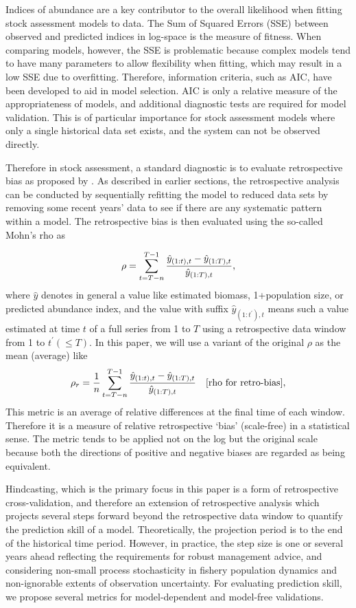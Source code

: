 
Indices of abundance are a key contributor to the overall likelihood when fitting stock assessment models to data. The Sum of Squared Errors (SSE) between observed and predicted indices in log-space is the measure of fitness. When comparing models, however, the SSE is problematic because complex models tend to have many parameters to allow flexibility when fitting, which may result in a low SSE due to overfitting. Therefore, information criteria, such as AIC, have been developed to aid in model selection. AIC is only a relative measure of the appropriateness of models, and additional diagnostic tests are required for model validation. This is of particular importance for stock assessment models where only a single historical data set exists, and the system can not be observed directly.

Therefore in stock assessment, a standard diagnostic is to evaluate retrospective bias as proposed by \cite{mohn1999retrospectyive}. As described in earlier sections, the retrospective analysis can be conducted by sequentially refitting the model to reduced data sets by removing some recent years' data to see if there are any systematic pattern within a model. The retrospective bias is then evaluated using the so-called Mohn's rho as 

\[
\rho = \displaystyle \sum_{t=T-n}^{T-1} \frac{\hat{y}_{(1:t),t}-\hat{y}_{(1:T),t}}{\hat{y}_{(1:T),t}}, 
\]
where $\hat{y}$ denotes in general a value like estimated biomass, 1+population size, or predicted abundance index, and the value with suffix $\hat{y}_{(1:t^\prime),t}$ means such a value estimated at time $t$ of a full series from 1 to $T$ using a retrospective data window from 1 to $t^\prime (\leq T)$. In this paper, we will use a variant of the original $\rho$ as the mean (average) like 
\begin{equation}
\rho_r = \displaystyle \frac{1}{n} \sum_{t=T-n}^{T-1} \frac{\hat{y}_{(1:t),t}-\hat{y}_{(1:T),t}}{\hat{y}_{(1:T),t}} 
\quad \mbox{[rho for retro-bias]}, 
\end{equation}
This metric is an average of relative differences at the final time of each window. Therefore it is a measure of relative retrospective `bias' (scale-free) in a statistical sense. The metric tends to be applied not on the log but the original scale because both the directions of positive and negative biases are regarded as being equivalent. 

Hindcasting, which is the primary focus in this paper is a form of retrospective cross-validation, and therefore an extension of retrospective analysis which projects several steps forward beyond the retrospective data window to quantify the prediction skill of a model. Theoretically, the projection period is to the end of the historical time period. However, in practice, the step size is one or several years ahead reflecting the requirements for robust management advice, and considering non-small process stochasticity in fishery population dynamics and non-ignorable extents of observation uncertainty. For evaluating prediction skill, we propose several metrics for model-dependent and model-free validations.

